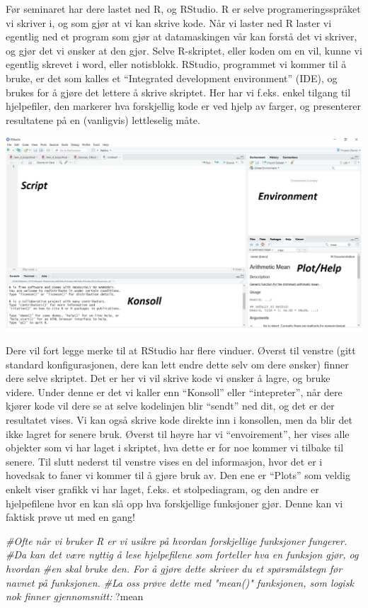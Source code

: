 \documentclass[
]{article}
\newenvironment{Shaded}{\begin{snugshade}}{\end{snugshade}}
\newcommand{\CommentTok}[1]{\textcolor[rgb]{0.56,0.35,0.01}{\textit{#1}}}
\newcommand{\NormalTok}[1]{#1}
\begin{document}
Før seminaret har dere lastet ned R, og RStudio. R er selve
programeringsspråket vi skriver i, og som gjør at vi kan skrive kode.
Når vi laster ned R laster vi egentlig ned et program som gjør at
datamaskingen vår kan forstå det vi skriver, og gjør det vi ønsker at
den gjør. Selve R-skriptet, eller koden om en vil, kunne vi egentlig
skrevet i word, eller notisblokk. RStudio, programmet vi kommer til å
bruke, er det som kalles et ``Integrated development environment''
(IDE), og brukes for å gjøre det lettere å skrive skriptet. Her har vi
f.eks. enkel tilgang til hjelpefiler, den markerer hva forskjellig kode
er ved hjelp av farger, og presenterer resultatene på en (vanligvis)
lettleselig måte.

\includegraphics{Bilder/Panes.png}

Dere vil fort legge merke til at RStudio har flere vinduer. Øverst til
venstre (gitt standard konfigurasjonen, dere kan lett endre dette selv
om dere ønsker) finner dere selve skriptet. Det er her vi vil skrive
kode vi ønsker å lagre, og bruke videre. Under denne er det vi kaller
enn ``Konsoll'' eller ``intepreter'', når dere kjører kode vil dere se
at selve kodelinjen blir ``sendt'' ned dit, og det er der resultatet
vises. Vi kan også skrive kode direkte inn i konsollen, men da blir det
ikke lagret for senere bruk. Øverst til høyre har vi ``envoirement'',
her vises alle objekter som vi har laget i skriptet, hva dette er for
noe kommer vi tilbake til senere. Til slutt nederst til venstre vises en
del informasjon, hvor det er i hovedsak to faner vi kommer til å gjøre
bruk av. Den ene er ``Plots'' som veldig enkelt viser grafikk vi har
laget, f.eks. et stolpediagram, og den andre er hjelpefilene hvor en kan
slå opp hva forskjellige funksjoner gjør. Denne kan vi faktisk prøve ut
med en gang!

\begin{Shaded}
\begin{Highlighting}[]
\CommentTok{#Ofte når vi bruker R er vi usikre på hvordan forskjellige funksjoner fungerer. }
\CommentTok{#Da kan det være nyttig å lese hjelpefilene som forteller hva en funksjon gjør, og hvordan}
\CommentTok{#en skal bruke den. For å gjøre dette skriver du et spørsmålstegn før navnet på funksjonen. }
\CommentTok{#La oss prøve dette med "mean()" funksjonen, som logisk nok finner gjennomsnitt:}
\NormalTok{?mean}
\end{Highlighting}
\end{Shaded}
\end{document}
